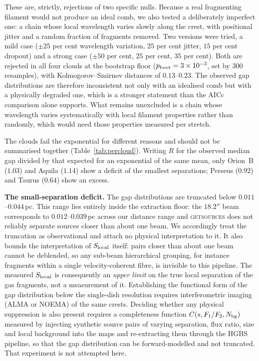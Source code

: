 \documentclass[usenatbib,twoside,twocolumn]{mnras}
\begin{document}
These are, strictly, rejections of two specific nulls. Because a real fragmenting filament would not produce an ideal comb, we also tested a deliberately imperfect one: a chain whose local wavelength varies slowly along the crest, with positional jitter and a random fraction of fragments removed. Two versions were tried, a mild case ($\pm25$ per cent wavelength variation, $25$ per cent jitter, $15$ per cent dropout) and a strong case ($\pm50$ per cent, $25$ per cent, $35$ per cent). Both are rejected in all four clouds at the bootstrap floor ($p_{\rm boot}=3\times10^{-3}$, set by $300$ resamples), with Kolmogorov--Smirnov distances of $0.13$--$0.23$. The observed gap distributions are therefore inconsistent not only with an idealised comb but with a physically degraded one, which is a stronger statement than the AICc comparison alone supports. What remains unexcluded is a chain whose wavelength varies systematically with local filament properties rather than randomly, which would need those properties measured per stretch.

The clouds fail the exponential for different reasons and should not be summarised together (Table~\ref{tab:percloud}). Writing $R$ for the observed median gap divided by that expected for an exponential of the same mean, only Orion~B ($1.03$) and Aquila ($1.14$) show a deficit of the smallest separations; Perseus ($0.92$) and Taurus ($0.64$) show an excess.

\smallskip\noindent\textbf{The small-separation deficit.} The gap distributions are truncated below $0.011$--$0.044$\,pc. This range lies entirely inside the extraction floor: the $18.2''$ beam corresponds to $0.012$--$0.039$\,pc across our distance range and \textsc{getsources} does not reliably separate sources closer than about one beam. We accordingly treat the truncation as observational and attach no physical interpretation to it. It also bounds the interpretation of $S_{\rm local}$ itself: pairs closer than about one beam cannot be deblended, so any sub-beam hierarchical grouping, for instance fragments within a single velocity-coherent fibre, is invisible to this pipeline. The measured $S_{\rm local}$ is consequently an \emph{upper limit} on the true local separation of the gas fragments, not a measurement of it. Establishing the functional form of the gap distribution below the single-dish resolution requires interferometric imaging (ALMA or NOEMA) of the same crests. Deciding whether any physical suppression is also present requires a completeness function $C(s,F_1/F_2,N_{\rm bg})$ measured by injecting synthetic source pairs of varying separation, flux ratio, size and local background into the maps and re-extracting them through the HGBS pipeline, so that the gap distribution can be forward-modelled and not truncated. That experiment is not attempted here.
\end{document}
